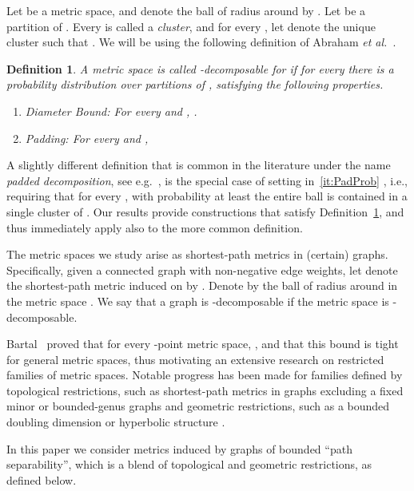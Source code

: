 \documentclass[11pt,fleqn]{article}
\newtheorem{definition}[theorem]{Definition}
\newcommand{\etal}{{\em et al.\ }\xspace}
\begin{document}
Let  be a metric space,
and denote the ball of radius  around  by . 
Let  be a partition of . Every  is called a {\em cluster},
and for every , let  denote the unique cluster 
 such that .
We will be using the following definition of Abraham \etal \cite{AGGNT14}.

\begin{definition}\label{def:beta} 
A metric space  is called {\em -decomposable} for  if for every  there is a probability distribution  over partitions of , satisfying the following properties.
\begin{enumerate}
\renewcommand{\theenumi}{(\alph{enumi})}
	\item \label{it:DiameterBound}
	Diameter Bound: For every  and , .
	\item \label{it:PadProb}
	Padding: For every  and , 
\end{enumerate}
\end{definition}

A slightly different definition that is common in the literature 
under the name {\em padded decomposition}, see e.g.\ \cite{KLMN05,LN2004}, 
is the special case of setting in~\ref{it:PadProb} ,
i.e., requiring that for every , with probability at least  
the entire ball  is contained in a single cluster of .
Our results provide constructions that satisfy Definition~\ref{def:beta}, 
and thus immediately apply also to the more common definition.

The metric spaces we study arise as shortest-path metrics in (certain) graphs. 
Specifically, given  
a connected graph with non-negative edge weights, let  denote the shortest-path metric induced on  by . Denote by  the ball of radius  around  in the metric space .
We say that a graph  is -decomposable if the metric space  is -decomposable.

Bartal~\cite{Bartal96} proved that for every -point metric space, , and that this bound is tight for general metric spaces, thus motivating an extensive research on restricted families of metric spaces. 
Notable progress has been made for families defined by topological restrictions, such as shortest-path metrics in graphs excluding a fixed minor \cite{KPR93,FT03,AGGNT14} or bounded-genus graphs \cite{LS10,AGGNT14} and geometric restrictions, such as a bounded doubling dimension \cite{GKL03} or hyperbolic structure \cite{KL06}.

In this paper we consider metrics induced by graphs of bounded ``path separability'', which is a blend of topological and geometric restrictions,
as defined below.
\end{document}
